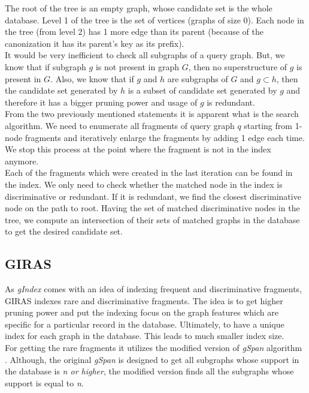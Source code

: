 The root of the tree is an empty graph, whose candidate set is the whole database. Level 1 of the tree is the set of vertices (graphs of size 0). Each node in the tree (from level 2) has 1 more edge than its parent (because of the canonization it has its parent’s key as its prefix).\\

It would be very inefficient to check all subgraphs of a query graph. But, we know that if subgraph $ g $ is not present in graph $ G $, then no superstructure of $ g $ is present in $ G $. Also, we know that if $ g $ and $ h $ are subgraphs of $ G $ and $ g \subset h $, then the candidate set generated by $ h $ is a subset of candidate set generated by $ g $ and therefore it has a bigger pruning power and usage of $ g $ is redundant.\\

From the two previously mentioned statements it is apparent what is the search algorithm. We need to enumerate all fragments of query graph $ q $ starting from 1-node fragments and iteratively enlarge the fragments by adding 1 edge each time. We stop this process at the point where the fragment is not in the index anymore.\\

Each of the fragments which were created in the last iteration can be found in the index. We only need to check whether the matched node in the index is discriminative or redundant. If it is redundant, we find the closest discriminative node on the path to root. Having the set of matched discriminative nodes in the tree, we compute an intersection of their sets of matched graphs in the database to get the desired candidate set.

\subsection{GIRAS}

As \textit{gIndex} comes with an idea of indexing frequent and discriminative fragments, GIRAS indexes rare and discriminative fragments. The idea is to get higher pruning power and put the indexing focus on the graph features which are specific for a particular record in the database. Ultimately, to have a unique index for each graph in the database. This leads to much smaller index size.\\

For getting the rare fragments it utilizes the modified version of \textit{gSpan} algorithm \cite{gspan}. Although, the original \textit{gSpan} is designed to get all subgraphs whose support in the database is \textit{n or higher}, the modified version finds all the subgraphs whose support is equal to \textit{n}.\\

